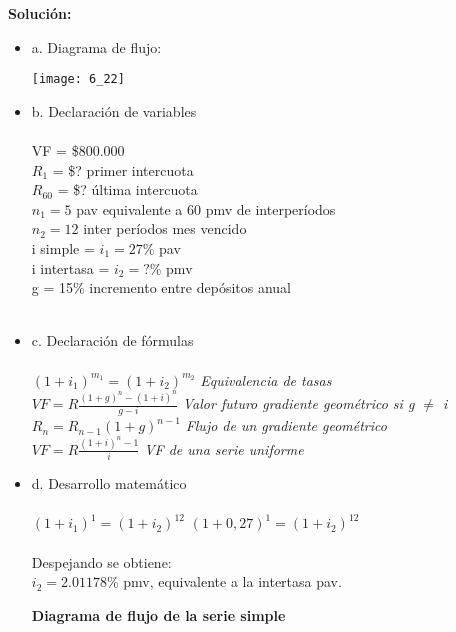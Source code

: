 	\textbf{Solución:}\\
	\begin{itemize}
		\item a. Diagrama de flujo:
		\begin{center}
			\texttt{[image: 6\_22]}
		\end{center}
		\item b. Declaración de variables\\
		\\VF = \$800.000\\
		$R_{1}$ = \$? primer intercuota\\
		$R_{60}$ = \$? última intercuota\\
		$n_{1} = 5$ pav equivalente a 60 pmv de interperíodos\\
        $n_{2} =  12$ inter períodos mes vencido\\ 	
		i simple = $i_{1}= 27$\% pav\\
		i intertasa = $i_{2}= ?$\% pmv\\
		g = 15\% incremento entre depósitos anual\\\\
		\item c. Declaración de fórmulas\\\\
		$(1+i_{1})^{m_{1}} = (1+i_{2})^{m_{2}}$ \hspace{31 pt} \textit{Equivalencia de tasas}\\
		$VF = R\frac{(1+g)^n-(1+i)^n}{g-i}$ \hspace{38 pt} \textit{Valor futuro gradiente geométrico si g $\not=$ i}\\
		$R_{n} = R_{n-1}(1+g)^{n-1}$ \hspace{35 pt} \textit{Flujo de un gradiente geométrico}\\
		$VF = R\frac{(1+i)^{n}-1}{i}$ \hspace{56 pt} \textit{VF de una serie uniforme}\\
		\item d. Desarrollo matemático\\\\
		$(1+i_{1})^1 = (1+i_{2})^{12}$
		$(1+0,27)^1 = (1+i_{2})^{12}$\\\\ Despejando se obtiene: \\
		$i_{2} = 2.01178$\% pmv, equivalente a la intertasa pav.\\
		\begin{center}
			\textbf{Diagrama de flujo de la serie simple}\\

\end{center}
\end{itemize}
